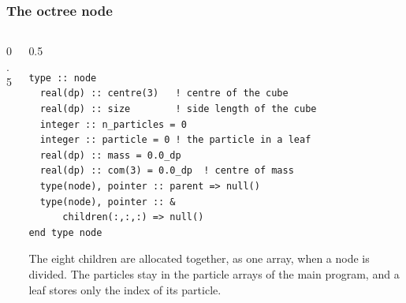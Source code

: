 \begin{frame}[fragile]
  \frametitle{The octree node}
  \begin{columns}[T]
    \begin{column}{0.5\textwidth}
      \centering
      \vspace*{2mm}
    \end{column}

    \begin{column}{0.5\textwidth}
      \begin{lstlisting}
type :: node
  real(dp) :: centre(3)   ! centre of the cube
  real(dp) :: size        ! side length of the cube
  integer :: n_particles = 0
  integer :: particle = 0 ! the particle in a leaf
  real(dp) :: mass = 0.0_dp
  real(dp) :: com(3) = 0.0_dp  ! centre of mass
  type(node), pointer :: parent => null()
  type(node), pointer :: &
      children(:,:,:) => null()
end type node
      \end{lstlisting}
      \small
      The eight children are allocated together, as one array, when a node is divided. The particles stay in the particle arrays of the main program, and a leaf stores only the index of its particle.
    \end{column}
  \end{columns}
\end{frame}


